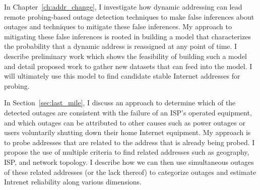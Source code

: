 In Chapter~\ref{ch:addr_change}, I investigate how dynamic addressing can
lead remote probing-based outage detection techniques to make false inferences about outages and techniques to
mitigate these false inferences. My approach to mitigating
these false inferences is rooted in building a model that characterizes
the probability that a dynamic address is reassigned at any point of time. I describe preliminary
work which shows the feasibility of building such a model and detail
proposed work to gather new datasets that can feed into the
model. I will ultimately use this model to find candidate stable Internet
addresses for probing.

In Section~\ref{sec:last_mile}, I discuss an approach to determine
which of the detected outages are consistent with the failure of an
ISP's operated equipment, and which outages can be attributed to other
causes such as power outages or users voluntarily shutting down their home
Internet equipment. My approach is to probe addresses that are related
to the address that is already being probed. I propose the use of multiple criteria
to find related addresses such as geography, ISP, and network
topology. I describe how we can then use simultaneous outages of these
related addresses (or the lack thereof) to categorize outages and
estimate Intrenet reliability along various dimensions.







